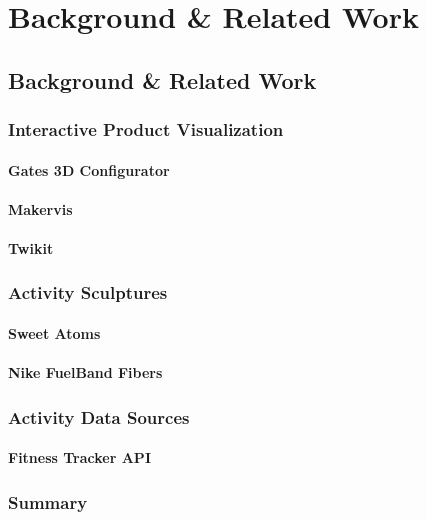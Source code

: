\chapter{Background \& Related Work}
\label{ch:related}
\section{Background \& Related Work}
\subsection{Interactive Product Visualization}
\subsubsection{Gates 3D Configurator}
\subsubsection{Makervis}
\subsubsection{Twikit}
\subsection{Activity Sculptures}
\subsubsection{Sweet Atoms}
\subsubsection{Nike FuelBand Fibers}
\subsection{Activity Data Sources}
\subsubsection{Fitness Tracker API}
\subsection{Summary}
